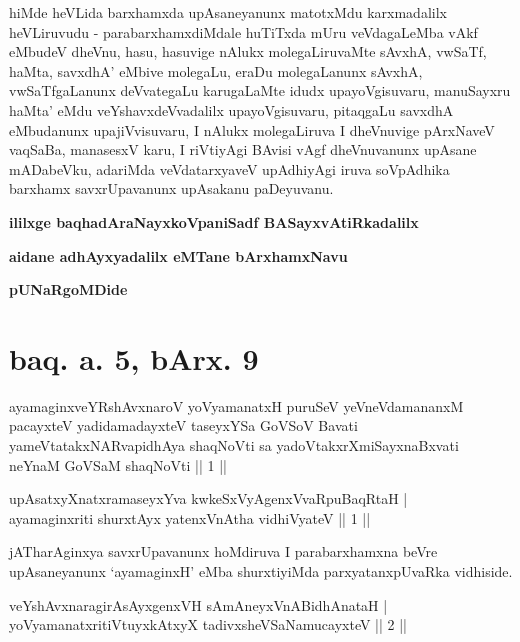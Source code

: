 
\begin{artha}
hiMde heVLida barxhamxda upAsaneyanunx matotxMdu karxmadalilx heVLiruvudu - parabarxhamxdiMdale huTiTxda mUru veVdagaLeMba vAkf eMbudeV dheVnu, hasu, hasuvige nAlukx molegaLiruvaMte sAvxhA, vwSaTf, haMta, savxdhA' eMbive molegaLu, eraDu molegaLanunx sAvxhA, vwSaTfgaLanunx deVvategaLu karugaLaMte idudx upayoVgisuvaru, manuSayxru haMta' eMdu veYshavxdeVvadalilx upayoVgisuvaru, pitaqgaLu savxdhA eMbudanunx upajiVvisuvaru, I nAlukx molegaLiruva I dheVnuvige pArxNaveV vaqSaBa, manasesxV karu, I riVtiyAgi BAvisi vAgf dheVnuvanunx upAsane mADabeVku, adariMda veVdatarxyaveV upAdhiyAgi iruva soVpAdhika barxhamx savxrUpavanunx upAsakanu paDeyuvanu.
\end{artha}

\begin{center}
{\bf ililxge baqhadAraNayxkoVpaniSadf BASayxvAtiRkadalilx}
\smallskip

{\bf aidane adhAyxyadalilx eMTane bArxhamxNavu}

{\bf pUNaRgoMDide}
\end{center}

\section*{baq. a. 5, bArx. 9}

\begin{shl}
ayamaginxveYRshAvxnaroV yoV\s yamanatxH puruSeV yeVneVdamananxM pacayxteV yadidamadayxteV taseyxYSa GoVSoV Bavati yameVtatakxNARvapidhAya shaqNoVti sa yadoVtakxrXmiSayxnaBxvati neYnaM GoVSaM shaqNoVti || 1 ||
\end{shl}


\begin{shl}
upAsatxyXnatxramaseyxYva kwkeSxVyAgenxVvaRpuBaqRtaH | \\
ayamaginxriti shurxtAyx yatenxVnAtha vidhiVyateV \hfill ||  1 || 
\end{shl}

\begin{artha}
jATharAginxya savxrUpavanunx hoMdiruva I parabarxhamxna beVre upAsaneyanunx `ayamaginxH' eMba shurxtiyiMda parxyatanxpUvaRka vidhiside.
\end{artha}


\begin{shl}
veYshAvxnaragirA\s sAyxgenxVH sAmAneyxVnABidhAnataH | \\
yoV\s yamanatxritiVtuyxkAtxyX tadivxsheVSaNamucayxteV \hfill ||  2 || 
\end{shl}

